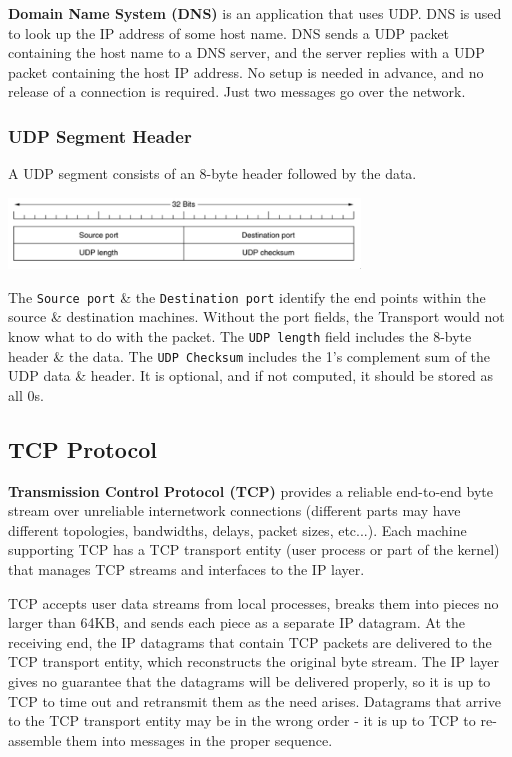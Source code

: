 \documentclass[11pt]{article}
\begin{document}
\textbf{Domain Name System (DNS)} is an application that uses UDP. 
DNS is used to look up the IP address of some host name. 
DNS sends a UDP packet containing the host name to a DNS server, and the server replies with a UDP packet containing the host IP address.
No setup is needed in advance, and no release of a connection is required.
Just two messages go over the network.

\subsubsection{UDP Segment Header}
A UDP segment consists of an 8-byte header followed by the data.

\begin{center}
    \includegraphics[width=0.7\textwidth]{udpheader.png}
\end{center}

The \verb|Source port| \& the \verb|Destination port| identify the end points within the source \& destination machines. 
Without the port fields, the Transport would not know what to do with the packet.
The \verb|UDP length| field includes the 8-byte header \& the data.
The \verb|UDP Checksum| includes the 1's complement sum of the UDP data \& header. 
It is optional, and if not computed, it should be stored as all 0s.

\subsection{TCP Protocol}
\textbf{Transmission Control Protocol (TCP)} provides a reliable end-to-end byte stream over unreliable internetwork connections (different parts may have different topologies, bandwidths, delays, packet sizes, etc...). 
Each machine supporting TCP has a TCP transport entity (user process or part of the kernel) that manages TCP streams and interfaces to the IP layer.

TCP accepts user data streams from local processes, breaks them into pieces no larger than 64KB, and sends each piece as a separate IP datagram.
At the receiving end, the IP datagrams that contain TCP packets are delivered to the TCP transport entity, which reconstructs the original byte stream.
The IP layer gives no guarantee that the datagrams will be delivered properly, so it is up to TCP to time out and retransmit them as the need arises.
Datagrams that arrive to the TCP transport entity may be in the wrong order - it is up to TCP to re-assemble them into messages in the proper sequence.
\end{document}
